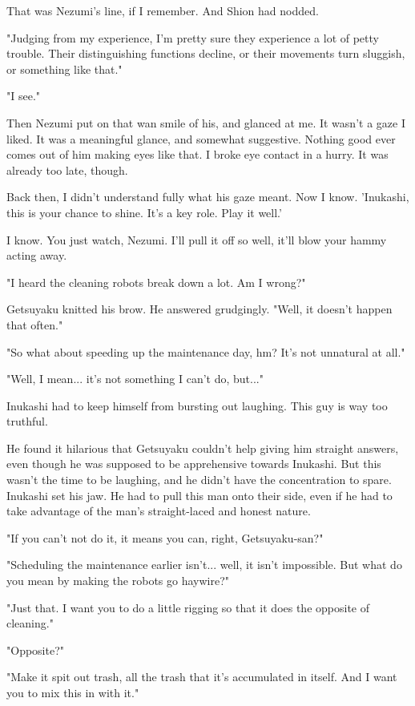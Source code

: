 That was Nezumi's line, if I remember. And Shion had nodded.

"Judging from my experience, I'm pretty sure they experience a lot of
petty trouble. Their distinguishing functions decline, or their
movements turn sluggish, or something like that."

"I see."

Then Nezumi put on that wan smile of his, and glanced at me. It wasn't a
gaze I liked. It was a meaningful glance, and somewhat suggestive.
Nothing good ever comes out of him making eyes like that. I broke eye
contact in a hurry. It was already too late, though.

Back then, I didn't understand fully what his gaze meant. Now I know.
'Inukashi, this is your chance to shine. It's a key role. Play it well.'

I know. You just watch, Nezumi. I'll pull it off so well, it'll blow
your hammy acting away.

"I heard the cleaning robots break down a lot. Am I wrong?"

Getsuyaku knitted his brow. He answered grudgingly. "Well, it doesn't
happen that often."

"So what about speeding up the maintenance day, hm? It's not unnatural
at all."

"Well, I mean... it's not something I can't do, but..."

Inukashi had to keep himself from bursting out laughing. This guy is way
too truthful.

He found it hilarious that Getsuyaku couldn't help giving him straight
answers, even though he was supposed to be apprehensive towards
Inukashi. But this wasn't the time to be laughing, and he didn't have
the concentration to spare. Inukashi set his jaw. He had to pull this
man onto their side, even if he had to take advantage of the man's
straight-laced and honest nature.

"If you can't not do it, it means you can, right, Getsuyaku-san?"

"Scheduling the maintenance earlier isn't... well, it isn't impossible.
But what do you mean by making the robots go haywire?"

"Just that. I want you to do a little rigging so that it does the
opposite of cleaning."

"Opposite?"

"Make it spit out trash, all the trash that it's accumulated in itself.
And I want you to mix this in with it."

